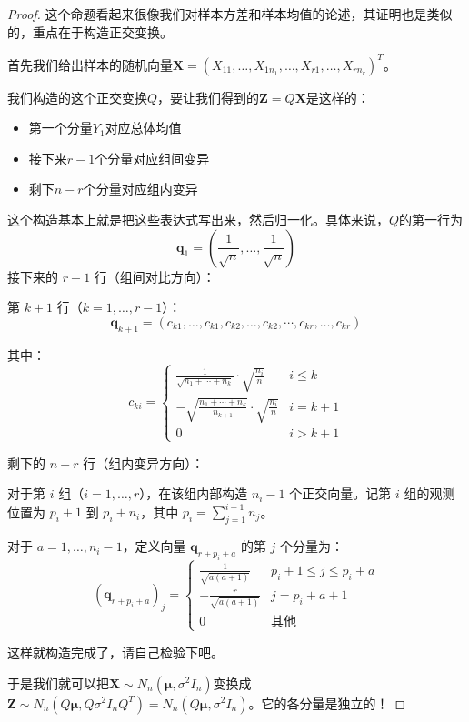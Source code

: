 \begin{proof}
这个命题看起来很像我们对样本方差和样本均值的论述，其证明也是类似的，重点在于构造正交变换。

首先我们给出样本的随机向量$\mathbf{X} = (X_{11},\ldots,X_{1n_1},\ldots,X_{r1},\ldots,X_{rn_r})^T$。

我们构造的这个正交变换$Q$，要让我们得到的$\mathbf{Z}=Q\mathbf{X}$是这样的：
\begin{itemize}
    \item 第一个分量$Y_1$对应总体均值
    \item 接下来$r-1$个分量对应组间变异
    \item 剩下$n-r$个分量对应组内变异
\end{itemize}

这个构造基本上就是把这些表达式写出来，然后归一化。具体来说，$Q$的第一行为
\[
\mathbf{q}_1=(\frac{1}{\sqrt{n}},\ldots,\frac{1}{\sqrt{n}})
\]
接下来的 $r-1$ 行（组间对比方向）：

第 $k+1$ 行（$k=1,\ldots,r-1$）：
\[
\mathbf{q}_{k+1} = (c_{k1}, \ldots, c_{k1},
c_{k2}, \ldots, c_{k2},
\cdots ,
c_{kr}, \ldots, c_{kr})
\]

其中：
\[
c_{ki} = 
\begin{cases}
\displaystyle \frac{1}{\sqrt{n_1 + \cdots + n_k}} \cdot \sqrt{\frac{n_i}{n}} & i \leq k \\
\displaystyle -\sqrt{\frac{n_1 + \cdots + n_k}{n_{k+1}}} \cdot \sqrt{\frac{n_i}{n}} & i = k+1 \\
0 & i > k+1
\end{cases}
\]

剩下的 $n-r$ 行（组内变异方向）：

对于第 $i$ 组（$i=1,\ldots,r$），在该组内部构造 $n_i-1$ 个正交向量。记第 $i$ 组的观测位置为 $p_i+1$ 到 $p_i+n_i$，其中 $p_i = \sum_{j=1}^{i-1} n_j$。

对于 $a=1,\ldots,n_i-1$，定义向量 $\mathbf{q}_{r+p_i+a}$ 的第 $j$ 个分量为：
\[
(\mathbf{q}_{r+p_i+a})_j = 
\begin{cases}
\displaystyle \frac{1}{\sqrt{a(a+1)}} &  p_i+1 \leq j \leq p_i+a \\
\displaystyle -\frac{r}{\sqrt{a(a+1)}} &  j = p_i+a+1 \\
0 & \text{其他}
\end{cases}
\]

这样就构造完成了，请自己检验下吧。

于是我们就可以把$\mathbf{X}\sim N_n(\boldsymbol{\mu},\sigma^2I_n)$变换成
$\mathbf{Z}\sim N_n(Q\boldsymbol{\mu},Q\sigma^2I_n Q^T) = N_n(Q\boldsymbol{\mu},\sigma^2I_n)$。它的各分量是独立的！


\end{proof}
